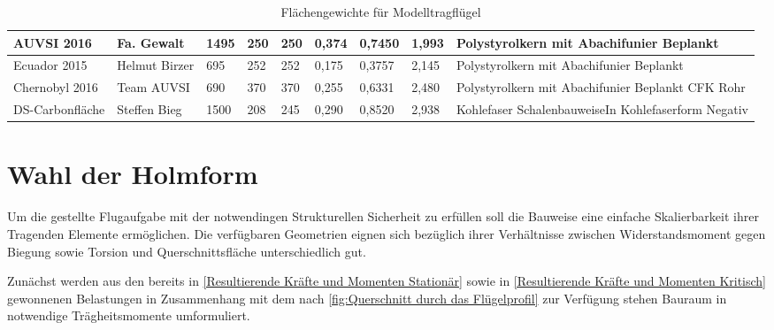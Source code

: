 \begin{table}
\begin{adjustbox}{angle=90}
\begin{tabular}{|p{2cm}|p{2.5cm}|l|l|l|l|l|p{2cm}|p{4cm}|}
AUVSI 2016                     & Fa. Gewalt         & 1495            & 250              & 250              & 0,374         &  0,7450       & 1,993                    & Polystyrolkern mit Abachifunier Beplankt                         \\\hline
Ecuador 2015                   & Helmut Birzer      & 695             & 252              & 252              & 0,175         &  0,3757       & 2,145                    & Polystyrolkern mit Abachifunier Beplankt                         \\\hline
Chernobyl 2016                 & Team AUVSI         & 690             & 370              & 370              & 0,255         &  0,6331       & 2,480                    & Polystyrolkern mit Abachifunier Beplankt CFK Rohr                \\\hline
DS-Carbonfläche               & Steffen Bieg       & 1500            & 208              & 245              & 0,290         &  0,8520       & 2,938                    & Kohlefaser SchalenbauweiseIn Kohlefaserform Negativ \\  \hline               
\end{tabular}
\end{adjustbox}
\caption{Flächengewichte für Modelltragflügel}
\label{tab:Flächengewichte Für Modelltragflügel}
\end{table}

\section{Wahl der Holmform}

Um die gestellte Flugaufgabe mit der notwendingen Strukturellen Sicherheit zu erfüllen soll die Bauweise eine einfache Skalierbarkeit ihrer Tragenden Elemente ermöglichen.
Die verfügbaren Geometrien eignen sich bezüglich ihrer Verhältnisse zwischen Widerstandsmoment gegen Biegung sowie Torsion und Querschnittsfläche unterschiedlich gut.

Zunächst werden aus den bereits in \ref{Resultierende Kräfte und Momenten Stationär} sowie in \ref{Resultierende Kräfte und Momenten Kritisch} gewonnenen Belastungen in Zusammenhang mit dem nach \ref{fig:Querschnitt durch das Flügelprofil} zur Verfügung stehen Bauraum in notwendige Trägheitsmomente umformuliert.

